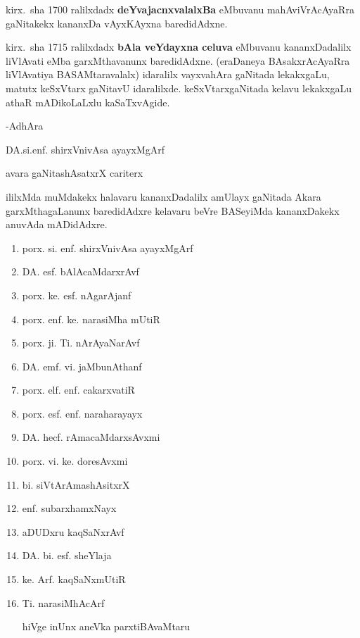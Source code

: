 kirx.~sha {\rm 1700} ralilxdadx \textbf{deYvajacnxvalalxBa} eMbuvanu mahAviVrAcAyaRra gaNitakekx kananxDa vAyxKAyxna baredidAdxne.

kirx.~sha {\rm 1715} ralilxdadx \textbf{bAla veYdayxna celuva} eMbuvanu kananxDadalilx liVlAvati eMba garxMthavanunx baredidAdxne. (eraDaneya BAsakxrAcAyaRra liVlAvatiya BASAMtaravalalx) idaralilx vayxvahAra gaNitada lekakxgaLu, matutx keSxVtarx gaNitavU idaralilxde. keSxVtarxgaNitada kelavu lekakxgaLu athaR mADikoLaLxlu kaSaTxvAgide.

\medskip
\hfill{-AdhAra}\hspace{1.8cm}

\hfill{DA.si.enf. shirxVnivAsa ayayxMgArf}

\hfill{avara gaNitashAsatxrX cariterx}\hspace{1cm}

ililxMda muMdakekx halavaru kananxDadalilx amUlayx gaNitada Akara garxMthagaLanunx baredidAdxre kelavaru beVre BASeyiMda kananxDakekx anuvAda mADidAdxre.

\begin{enumerate}[\rm 1)]
\item porx. si. enf. shirxVnivAsa ayayxMgArf

\item DA. esf. bAlAcaMdarxrAvf

\item porx. ke. esf. nAgarAjanf

\item porx. enf. ke. narasiMha mUtiR

\item porx. ji. Ti. nArAyaNarAvf

\item DA. emf. vi. jaMbunAthanf

\item porx. elf. enf. cakarxvatiR

\item porx. esf. enf. naraharayayx

\item DA. hecf. rAmacaMdarxsAvxmi

\item porx. vi. ke. doresAvxmi

\item bi. siVtArAmashAsitxrX

\item enf. subarxhamxNayx

\item aDUDxru kaqSaNxrAvf

\item DA. bi. esf. sheYlaja

\item ke. Arf. kaqSaNxmUtiR

\item Ti. narasiMhAcArf

hiVge inUnx aneVka parxtiBAvaMtaru
\end{enumerate}

